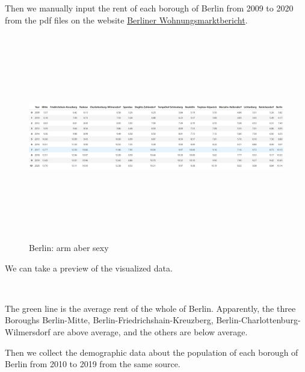 \documentclass[11pt]{article}
\begin{document}
  

       
    Then we manually input the rent of each borough of Berlin from 2009 to 2020 from
the pdf files on the website
\href{https://www.stadtentwicklung.berlin.de/wohnen/wohnungsmarktbericht/}{Berliner
Wohnungsmarktbericht}.

\begin{figure}
\centering
\includegraphics[width=16.5cm, height=9cm]{"Screenshot (28).png"}
\caption{Berlin: arm aber sexy}
\end{figure}


        
    We can take a preview of the visualized data.

   

    \begin{center}
    \end{center}
    { \hspace*{\fill} \\}
    
    The green line is the average rent of the whole of Berlin. Apparently,
the three Boroughs Berlin-Mitte, Berlin-Friedrichshain-Kreuzberg,
Berlin-Charlottenburg-Wilmersdorf are above average, and the others are
below average.

    Then we collect the demographic data about the population of each
borough of Berlin from 2010 to 2019 from the same source.
\end{document}
